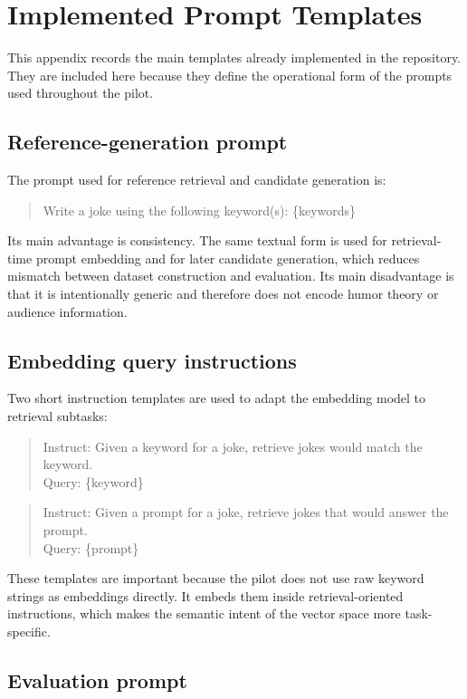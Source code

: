 
\chapter{Implemented Prompt Templates}

This appendix records the main templates already implemented in the repository. They are included here because they define the operational form of the prompts used throughout the pilot.

\section{Reference-generation prompt}

The prompt used for reference retrieval and candidate generation is:
\begin{quote}
    \ttfamily
    Write a joke using the following keyword(s): \{keywords\}
\end{quote}

Its main advantage is consistency. The same textual form is used for retrieval-time prompt embedding and for later candidate generation, which reduces mismatch between dataset construction and evaluation. Its main disadvantage is that it is intentionally generic and therefore does not encode humor theory or audience information.

\section{Embedding query instructions}

Two short instruction templates are used to adapt the embedding model to retrieval subtasks:
\begin{quote}
    \ttfamily
    Instruct: Given a keyword for a joke, retrieve jokes would match the keyword.\\
    Query: \{keyword\}
\end{quote}

\begin{quote}
    \ttfamily
    Instruct: Given a prompt for a joke, retrieve jokes that would answer the prompt.\\
    Query: \{prompt\}
\end{quote}

These templates are important because the pilot does not use raw keyword strings as embeddings directly. It embeds them inside retrieval-oriented instructions, which makes the semantic intent of the vector space more task-specific.

\section{Evaluation prompt}

